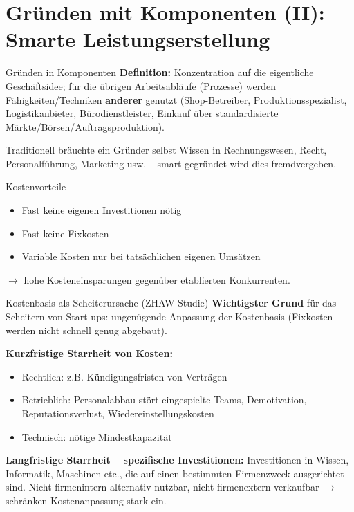 \documentclass[a4paper, fontsize=7pt]{scrartcl}
\begin{document}
\section{Gründen mit Komponenten (II): Smarte Leistungserstellung}

\begin{mainbox}{Gründen in Komponenten}
\textbf{Definition:} Konzentration auf die eigentliche Geschäftsidee; für die
übrigen Arbeitsabläufe (Prozesse) werden Fähigkeiten/Techniken \textbf{anderer}
genutzt (Shop-Betreiber, Produktionsspezialist, Logistikanbieter,
Bürodienstleister, Einkauf über standardisierte Märkte/Börsen/Auftragsproduktion).

Traditionell bräuchte ein Gründer selbst Wissen in Rechnungswesen, Recht,
Personalführung, Marketing usw. -- smart gegründet wird dies fremdvergeben.
\end{mainbox}

\begin{mainbox}{Kostenvorteile}
\begin{itemize}
    \item Fast keine eigenen Investitionen nötig
    \item Fast keine Fixkosten
    \item Variable Kosten nur bei tatsächlichen eigenen Umsätzen
\end{itemize}
$\to$ hohe Kosteneinsparungen gegenüber etablierten Konkurrenten.
\end{mainbox}

\begin{mainbox}{Kostenbasis als Scheiterursache (ZHAW-Studie)}
\textbf{Wichtigster Grund} für das Scheitern von Start-ups: ungenügende Anpassung
der Kostenbasis (Fixkosten werden nicht schnell genug abgebaut).

\textbf{Kurzfristige Starrheit von Kosten:}
\begin{itemize}
    \item Rechtlich: z.B. Kündigungsfristen von Verträgen
    \item Betrieblich: Personalabbau stört eingespielte Teams, Demotivation,
    Reputationsverlust, Wiedereinstellungskosten
    \item Technisch: nötige Mindestkapazität
\end{itemize}

\textbf{Langfristige Starrheit -- spezifische Investitionen:} Investitionen in
Wissen, Informatik, Maschinen etc., die auf einen bestimmten Firmenzweck
ausgerichtet sind. Nicht firmenintern alternativ nutzbar, nicht firmenextern
verkaufbar $\to$ schränken Kostenanpassung stark ein.
\end{mainbox}
\end{document}
